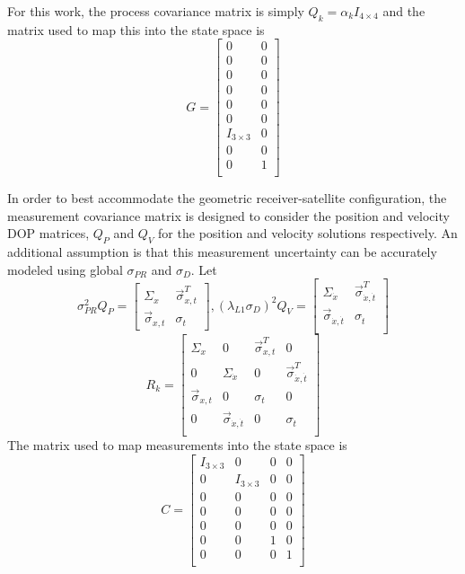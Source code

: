 For this work, the process covariance matrix is simply $Q_k = \alpha_kI_{4\times4}$ and the matrix used to map this into the state space is
\begin{equation}
G = \left[
\begin{array}{cc}
0 & 0\\
0 & 0\\
0 & 0\\
0 & 0\\
0 & 0\\
0 & 0\\
I_{3\times3} & 0\\
0 & 0\\
0 & 1\\
\end{array}
\right]
\end{equation}

In order to best accommodate the geometric receiver-satellite configuration, the measurement covariance matrix is designed to consider the position and velocity DOP matrices, $Q_P$ and $Q_V$ for the position and velocity solutions respectively.  An additional assumption is that this measurement uncertainty can be accurately modeled using global $\sigma_{PR}$ and $\sigma_{D}$.  
Let 
\begin{equation}
\sigma_{PR}^2Q_P = 
\left[
\begin{array}{cc}
\Sigma_x & \vec{\sigma}_{x,t}^T\\
\vec{\sigma}_{x,t} & \sigma_t
\end{array}
\right],
(\lambda_{L1}\sigma_D)^2Q_V = \left[
\begin{array}{cc}
\Sigma_{\dot{x}} & \vec{\sigma}_{\dot{x},\dot{t}}^T\\
\vec{\sigma}_{\dot{x},
\dot{t}} & \sigma_{\dot{t}}\\
\end{array}
\right]
\end{equation}
\begin{equation}
R_k = \left[
\begin{array}{cccc}
\Sigma_x & 0 & \vec{\sigma}_{x,t}^T & 0\\
0 & \Sigma_{\dot{x}} & 0 & \vec{\sigma}_{\dot{x},\dot{t}}^T\\
\vec{\sigma}_{x,t} & 0 & \sigma_t & 0\\
0 & \vec{\sigma}_{\dot{x},\dot{t}} & 0& \sigma_{\dot{t}}\\
\end{array}
\right]
\end{equation}
The matrix used to map measurements into the state space is
\begin{equation}
C = \left[
\begin{array}{cccc}
I_{3\times3} & 0 & 0 & 0\\
0 & I_{3\times3} & 0 & 0\\
0 & 0 & 0 & 0\\
0 & 0 & 0 & 0\\
0 & 0 & 0 & 0\\
0 & 0 & 1 & 0\\
0 & 0 & 0 & 1\\
\end{array}
\right]
\end{equation}

